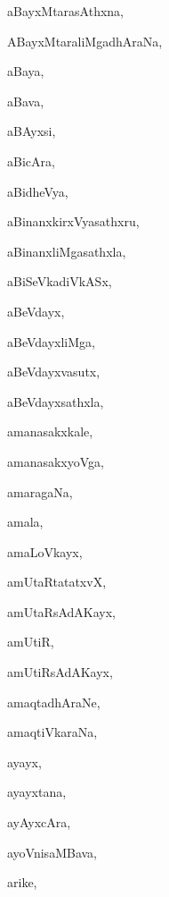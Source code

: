 \begin{multicols}{3}
{\noindent
{aBayxMtarasAthxna}, \pageref{aBayxMtarasAthxna}

\noindent
{ABayxMtaraliMgadhAraNa}, \pageref{ABayxMtaraliMgadhAraNa}

\noindent
{aBaya}, \pageref{aBaya}

\noindent
{aBava}, \pageref{aBava}

\noindent
{aBAyxsi}, \pageref{aBAyxsi}

\noindent
{aBicAra}, \pageref{aBicAra}

\noindent
{aBidheVya}, \pageref{aBidheVya}

\noindent
{aBinanxkirxVyasathxru}, \pageref{aBinanxkirxVyasathxru}

\noindent
{aBinanxliMgasathxla}, \pageref{aBinanxliMgasathxla}

\noindent
{aBiSeVkadiVkASx}, \pageref{aBiSeVkadiVkASx}

\noindent
{aBeVdayx}, \pageref{aBeVdayx}

\noindent
{aBeVdayxliMga}, \pageref{aBeVdayxliMga}

\noindent
{aBeVdayxvasutx}, \pageref{aBeVdayxvasutx}

\noindent
{aBeVdayxsathxla}, \pageref{aBeVdayxsathxla}

\noindent
{amanasakxkale}, \pageref{amanasakxkale}

\noindent
{amanasakxyoVga}, \pageref{amanasakxyoVga}

\noindent
{amaragaNa}, \pageref{amaragaNa}

\noindent
{amala}, \pageref{amala}

\noindent
{amaLoVkayx}, \pageref{amaLoVkayx}

\noindent
{amUtaRtatatxvX}, \pageref{amUtaRtatatxvX}

\noindent
{amUtaRsAdAKayx}, \pageref{amUtaRsAdAKayx}

\noindent
{amUtiR}, \pageref{amUtiR}

\noindent
{amUtiRsAdAKayx}, \pageref{amUtiRsAdAKayx}

\noindent
{amaqtadhAraNe}, \pageref{amaqtadhAraNe}

\noindent
{amaqtiVkaraNa}, \pageref{amaqtiVkaraNa}

\noindent
{ayayx}, \pageref{ayayx}

\noindent
{ayayxtana}, \pageref{ayayxtana}

\noindent
{ayAyxcAra}, \pageref{ayAyxcAra}

\noindent
{ayoVnisaMBava}, \pageref{ayoVnisaMBava}

\noindent
{arike}, \pageref{arike}

}
\end{multicols}
